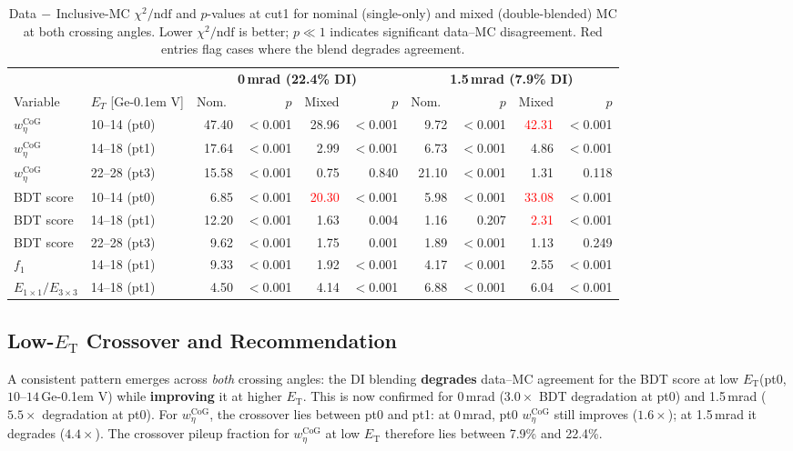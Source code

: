 \documentclass[11pt,a4paper]{article}
\newcommand{\ET}{\ensuremath{E_{\text{T}}}\xspace}
\newcommand{\wetacog}{\ensuremath{w_{\eta}^{\mathrm{CoG}}}\xspace}
\newcommand{\chidf}{\ensuremath{\chi^2/\mathrm{ndf}}\xspace}
\newcommand{\GeV}{\ifmmode {\mathrm{\ Ge\kern -0.1em V}}\else\textrm{Ge\kern -0.1em V}\fi\xspace}
\begin{document}
\begin{table}[H]
\centering
\caption{Data$\,-\,$Inclusive-MC \chidf and $p$-values at cut1 for
  nominal (single-only) and mixed (double-blended) MC at both
  crossing angles. Lower \chidf is better; $p \ll 1$ indicates
  significant data--MC disagreement. Red entries flag cases where
  the blend degrades agreement.}
\label{tab:chi2_full}
\footnotesize
\begin{tabular}{ll rrrr rrrr}
\toprule
 & & \multicolumn{4}{c}{\textbf{0\,mrad (22.4\% DI)}}
   & \multicolumn{4}{c}{\textbf{1.5\,mrad (7.9\% DI)}} \\
\cmidrule(lr){3-6} \cmidrule(lr){7-10}
Variable & $E_T$ [\GeV]
  & Nom.\ & $p$ & Mixed & $p$
  & Nom.\ & $p$ & Mixed & $p$ \\
\midrule
\wetacog & 10--14 (pt0)
  & 47.40 & $<$0.001 & 28.96 & $<$0.001
  &  9.72 & $<$0.001 & \textcolor{red}{42.31} & $<$0.001 \\
\wetacog & 14--18 (pt1)
  & 17.64 & $<$0.001 &  2.99 & $<$0.001
  &  6.73 & $<$0.001 &  4.86 & $<$0.001 \\
\wetacog & 22--28 (pt3)
  & 15.58 & $<$0.001 &  0.75 & 0.840
  & 21.10 & $<$0.001 &  1.31 & 0.118 \\
\midrule
BDT score & 10--14 (pt0)
  &  6.85 & $<$0.001 & \textcolor{red}{20.30} & $<$0.001
  &  5.98 & $<$0.001 & \textcolor{red}{33.08} & $<$0.001 \\
BDT score & 14--18 (pt1)
  & 12.20 & $<$0.001 &  1.63 & 0.004
  &  1.16 & 0.207 & \textcolor{red}{2.31} & $<$0.001 \\
BDT score & 22--28 (pt3)
  &  9.62 & $<$0.001 &  1.75 & 0.001
  &  1.89 & $<$0.001 &  1.13 & 0.249 \\
\midrule
$f_1$ & 14--18 (pt1)
  &  9.33 & $<$0.001 &  1.92 & $<$0.001
  &  4.17 & $<$0.001 &  2.55 & $<$0.001 \\
\midrule
$E_{1\times1}/E_{3\times3}$ & 14--18 (pt1)
  &  4.50 & $<$0.001 &  4.14 & $<$0.001
  &  6.88 & $<$0.001 &  6.04 & $<$0.001 \\
\bottomrule
\end{tabular}
\end{table}

\subsection{Low-\ET Crossover and Recommendation}
\label{subsec:lowet_discussion}

A consistent pattern emerges across \emph{both} crossing angles:
the DI blending \textbf{degrades} data--MC agreement for the BDT
score at low \ET (pt0, $10$--$14$\,\GeV) while \textbf{improving} it
at higher \ET. This is now confirmed for 0\,mrad ($3.0\times$ BDT
degradation at pt0) and 1.5\,mrad ($5.5\times$ degradation at pt0).
For \wetacog, the crossover lies between pt0 and pt1: at 0\,mrad,
pt0 \wetacog still improves ($1.6\times$); at 1.5\,mrad it
degrades ($4.4\times$). The crossover pileup fraction for \wetacog
at low \ET therefore lies between 7.9\% and 22.4\%.
\end{document}
